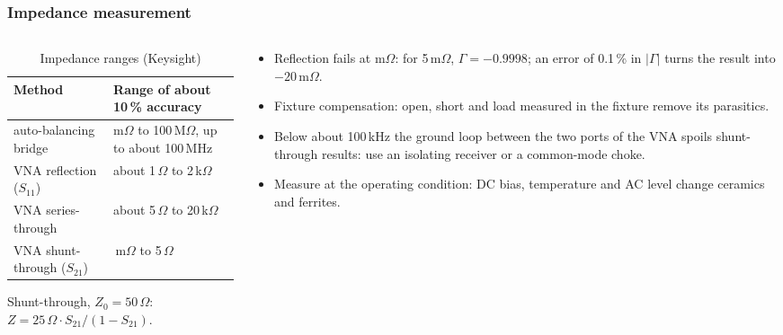\begin{frame}
	\frametitle{Impedance measurement}
	\begin{columns}[T]
		\begin{column}{0.5\textwidth}
			\begin{table}
				\centering
				\footnotesize
				\begin{tabular}{|l|>{\raggedright\arraybackslash}p{3.4cm}|}
					\hline
					\textbf{Method}            & \textbf{Range of about 10\,\% accuracy}            \\
					\hline
					auto-balancing bridge      & m$\Omega$ to 100\,M$\Omega$, up to about 100\,MHz   \\
					VNA reflection ($S_{11}$)  & about 1\,$\Omega$ to 2\,k$\Omega$                  \\
					VNA series-through         & about 5\,$\Omega$ to 20\,k$\Omega$                 \\
					VNA shunt-through ($S_{21}$) & 1\,m$\Omega$ to 5\,$\Omega$                     \\
					\hline
				\end{tabular}
				\caption{Impedance ranges (Keysight)}
			\end{table}
			\small
			Shunt-through, $Z_0=50\,\Omega$: $Z=25\,\Omega\cdot S_{21}/(1-S_{21})$.
		\end{column}
		\begin{column}{0.47\textwidth}
			\small
			\begin{itemize}
				\item Reflection fails at m$\Omega$: for 5\,m$\Omega$, $\Gamma=-0.9998$; an error of 0.1\,\% in $|\Gamma|$ turns the result into $-20$\,m$\Omega$.
				\item Fixture compensation: open, short and load measured in the fixture remove its parasitics.
				\item Below about 100\,kHz the ground loop between the two ports of the VNA spoils shunt-through results: use an isolating receiver or a common-mode choke.
				\item Measure at the operating condition: DC bias, temperature and AC level change ceramics and ferrites.
			\end{itemize}
		\end{column}
	\end{columns}
\end{frame}

